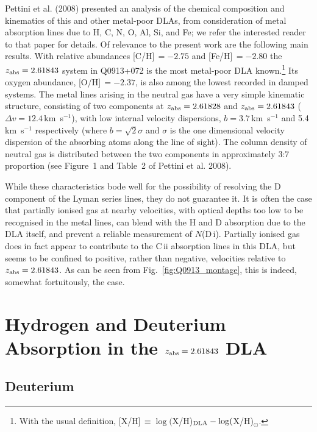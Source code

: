 \documentclass[useAMS,usenatbib]{mn2e}
\begin{document}
Pettini et al. (2008) presented an analysis of the chemical composition
and kinematics of this and other metal-poor DLAs, from consideration
of metal absorption lines due to H, C, N, O, Al, Si, and Fe;  we
refer the interested reader to that paper for details.
Of relevance to the present work are the following main results.
With relative abundances [C/H]\,$= -2.75$ and [Fe/H]\,$= -2.80$
the $z_{\rm abs} = 2.61843$ system in Q0913+072 is the most metal-poor
DLA known.\footnote{With the usual definition,
[X/H]\,$\equiv \log($X/H)$_{\rm DLA} -  \log($X/H)$_{\odot}$.}
Its oxygen abundance, [O/H]\,$= - 2.37$, is also among the lowest
recorded in damped systems.
The metal lines arising in the neutral gas have a very simple
kinematic structure, consisting of two components at
$z_{\rm abs} = 2.61828$ and $z_{\rm abs} = 2.61843$
($\Delta v = 12.4$\,km~s$^{-1}$),
with low internal velocity dispersions, $b = 3.7$\,km~s$^{-1}$
and 5.4\,km~s$^{-1}$ respectively (where $b = \sqrt{2} \sigma$
and $\sigma$ is the one dimensional velocity dispersion
of the absorbing atoms along the line of sight).
The column density of neutral gas is distributed between
the two components in approximately 3:7 proportion
(see Figure~1 and Table~2 of Pettini et al. 2008).

While these characteristics bode well for the possibility of resolving
the D component of the Lyman series lines, they do not guarantee it.
It is often the case that partially ionised gas at nearby velocities,
with optical depths too low to be recognised in the metal lines,
can blend with the H and D absorption due to the DLA itself,
and prevent a reliable measurement of $N$(D\,{\sc i}).
Partially ionised gas does in fact appear to contribute to
the C\,{\sc ii} absorption lines in this DLA, but seems to be confined to
positive, rather than negative, velocities relative to
$z_{\rm abs} = 2.61843$.
As can be seen from Fig.~\ref{fig:Q0913_montage},
this is indeed, somewhat fortuitously, the case.


\section{Hydrogen and Deuterium Absorption in the $z_{\rm abs} = 2.61843$ DLA}
\label{sec:HandD_inDLA}

\subsection{Deuterium}
\end{document}
